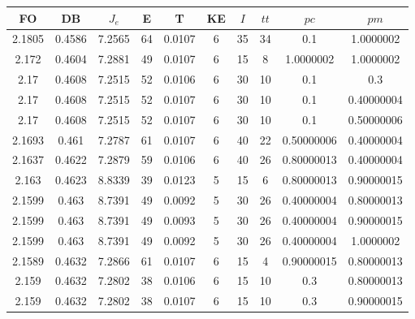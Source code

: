 \begin{table}[h!]
    \footnotesize
    \begin{center}
        \begin{tabular}{|c|c|c|c|c|c|c|c|c|c|}
        \hline
            {\bf FO} & {\bf DB} & $J_e$ & {\bf E} & {\bf T} & {\bf KE} & $I$ & $tt$ & $pc$ & $pm$ \\
        \hline
        \hline
            2.1805 & 0.4586  & 7.2565 & 64 & 0.0107 & 6 & 35 & 34 & 0.1 & 1.0000002\\
        \hline
        \hline
            2.172 & 0.4604  & 7.2881 & 49 & 0.0107 & 6 & 15 & 8 & 1.0000002 & 1.0000002\\
        \hline
        \hline
            2.17 & 0.4608  & 7.2515 & 52 & 0.0106 & 6 & 30 & 10 & 0.1 & 0.3\\
        \hline
        \hline
            2.17 & 0.4608  & 7.2515 & 52 & 0.0107 & 6 & 30 & 10 & 0.1 & 0.40000004\\
        \hline
        \hline
            2.17 & 0.4608  & 7.2515 & 52 & 0.0107 & 6 & 30 & 10 & 0.1 & 0.50000006\\
        \hline
        \hline
            2.1693 & 0.461  & 7.2787 & 61 & 0.0107 & 6 & 40 & 22 & 0.50000006 & 0.40000004\\
        \hline
        \hline
            2.1637 & 0.4622  & 7.2879 & 59 & 0.0106 & 6 & 40 & 26 & 0.80000013 & 0.40000004\\
        \hline
        \hline
            2.163 & 0.4623  & 8.8339 & 39 & 0.0123 & 5 & 15 & 6 & 0.80000013 & 0.90000015\\
        \hline
        \hline
            2.1599 & 0.463  & 8.7391 & 49 & 0.0092 & 5 & 30 & 26 & 0.40000004 & 0.80000013\\
        \hline
        \hline
            2.1599 & 0.463  & 8.7391 & 49 & 0.0093 & 5 & 30 & 26 & 0.40000004 & 0.90000015\\
        \hline
        \hline
            2.1599 & 0.463  & 8.7391 & 49 & 0.0092 & 5 & 30 & 26 & 0.40000004 & 1.0000002\\
        \hline
        \hline
            2.1589 & 0.4632  & 7.2866 & 61 & 0.0107 & 6 & 15 & 4 & 0.90000015 & 0.80000013\\
        \hline
        \hline
            2.159 & 0.4632  & 7.2802 & 38 & 0.0106 & 6 & 15 & 10 & 0.3 & 0.80000013\\
        \hline
        \hline
            2.159 & 0.4632  & 7.2802 & 38 & 0.0107 & 6 & 15 & 10 & 0.3 & 0.90000015\\

\end{tabular}
\end{center}
\end{table}
